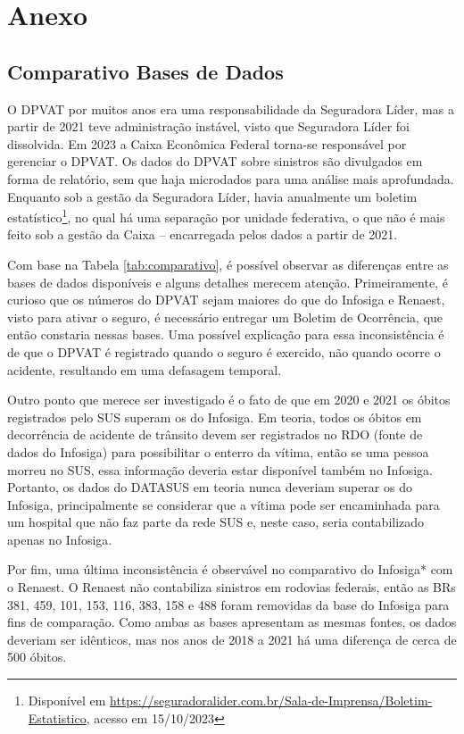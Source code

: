 \clearpage
\section{Anexo}

\subsection{Comparativo Bases de Dados}
\label{anx:comparativo}

O DPVAT por muitos anos era uma responsabilidade da Seguradora Líder, mas a partir de 2021 teve administração instável, visto que Seguradora Líder foi dissolvida. Em 2023 a Caixa Econômica Federal torna-se responsável por gerenciar o DPVAT. Os dados do DPVAT sobre sinistros são divulgados em forma de relatório, sem que haja microdados para uma análise mais aprofundada. Enquanto sob a gestão da Seguradora Líder, havia anualmente um boletim estatístico\footnote{Disponível em \url{https://seguradoralider.com.br/Sala-de-Imprensa/Boletim-Estatistico}, acesso em 15/10/2023}, no qual há uma separação por unidade federativa, o que não é mais feito sob a gestão da Caixa -- encarregada pelos dados a partir de 2021.



Com base na Tabela \ref{tab:comparativo}, é possível observar as diferenças entre as bases de dados disponíveis e alguns detalhes merecem atenção. Primeiramente, é curioso que os números do DPVAT sejam maiores do que do Infosiga e Renaest, visto para ativar o seguro, é necessário entregar um Boletim de Ocorrência, que então constaria nessas bases. Uma possível explicação para essa inconsistência é de que o DPVAT é registrado quando o seguro é exercido, não quando ocorre o acidente, resultando em uma defasagem temporal.

Outro ponto que merece ser investigado é o fato de que em 2020 e 2021 os óbitos registrados pelo SUS superam os do Infosiga. Em teoria, todos os óbitos em decorrência de acidente de trânsito devem ser registrados no RDO (fonte de dados do Infosiga) para possibilitar o enterro da vítima, então se uma pessoa morreu no SUS, essa informação deveria estar disponível também no Infosiga. Portanto, os dados do DATASUS em teoria nunca deveriam superar os do Infosiga, principalmente se considerar que a vítima pode ser encaminhada para um hospital que não faz parte da rede SUS e, neste caso, seria contabilizado apenas no Infosiga.

Por fim, uma última inconsistência é observável no comparativo do Infosiga* com o Renaest. O Renaest não contabiliza sinistros em rodovias federais, então as BRs 381, 459, 101, 153, 116, 383, 158 e 488 foram removidas da base do Infosiga para fins de comparação. Como ambas as bases apresentam as mesmas fontes, os dados deveriam ser idênticos, mas nos anos de 2018 a 2021 há uma diferença de cerca de 500 óbitos. 


